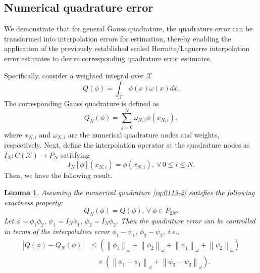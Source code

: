 \documentclass[pdflatex,sn-aps]{sn-jnl}%
\theoremstyle{thmstyleone}%
\newtheorem{lemma}{Lemma}[section]
\theoremstyle{thmstyletwo}%
\theoremstyle{thmstylethree}%
\begin{document}
\subsection{Numerical quadrature error}
We demonstrate that for general Gauss quadrature, the quadrature error can be transformed into  
interpolation errors for estimation, thereby enabling the application of the 
previously established scaled Hermite/Laguerre interpolation error estimates to 
derive corresponding quadrature error estimates.

Specifically, consider a weighted integral over $\mathcal{X}$
\begin{equation}\label{eq:0113-1}
  Q(\phi) = \int_{\mathcal{X}} \phi(x) \omega(x) dx.
\end{equation}
The corresponding Gauss quadrature is defined as
\begin{equation}\label{eq:0113-2}
  Q_N(\phi) = \sum_{j=0}^{N} \omega_{N,i}\phi(x_{N,i}),
\end{equation}
where $x_{N,i}$ and $\omega_{N,i}$ are the numerical quadrature nodes and weights, respectively.
Next, define the interpolation operator at the quadrature nodes as $I_{N}: C(\mathcal{X}) \rightarrow P_N$
satisfying
\begin{equation}\label{eq:0113-3}
  I_N[\phi](x_{N,i}) = \phi(x_{N,i}),\ \forall\, 0 \leqslant i \leqslant N.
\end{equation}
Then, we have the following result.
\begin{lemma}\label{lem:quadrature}
  Assuming the numerical quadrature \eqref{eq:0113-2} satisfies the following exactness property:
  \begin{equation}\label{eq:0113-4}
    Q_N(\phi) = Q(\phi),\, \forall\, \phi \in P_{2N}.
  \end{equation}
 Let $\phi=\phi_1 \phi_2$, $\psi_1=I_{N} \phi_1, \,\psi_2=I_{N} \phi_2$.
  Then the quadrature error can be controlled in terms of the interpolation error
  $\phi_1-\psi_1,\,\phi_2-\psi_2$, i.e.,
  \begin{equation}\label{eq:0113-5}
    \begin{aligned}
    \left|Q(\phi)-Q_{N}(\phi)\right| & \leqslant\left(\left\|\phi_1\right\|_\omega+\left\|\phi_2\right\|_\omega+\left\|\psi_1\right\|_\omega+\left\|\psi_2\right\|_\omega\right) \\
    &\quad \times\left(\left\|\phi_1-\psi_1\right\|_\omega+\left\|\phi_2-\psi_2\right\|_\omega\right).
    \end{aligned}
  \end{equation}
\end{lemma}
\end{document}
